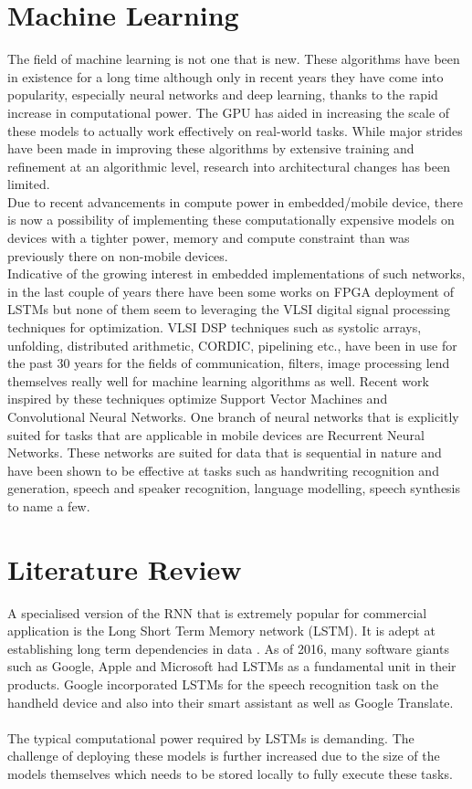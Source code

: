 \section{Machine Learning}
The field of machine learning is not one that is new. These algorithms have been in existence for a long time although only in recent years they have come into popularity, especially neural networks and deep learning, thanks to the rapid increase in computational power. The GPU has aided in increasing the scale of these models to actually work effectively on real-world tasks. While major strides have been made in improving these algorithms by extensive training and refinement at an algorithmic level, research into architectural changes has been limited. \\
Due to recent advancements in compute power in embedded/mobile device, there is now a possibility of implementing these computationally expensive models on devices with a tighter power, memory and compute constraint than was previously there on non-mobile devices. \\
Indicative of the growing interest in embedded implementations of such networks, in the last couple of years there have been some works on FPGA deployment of LSTMs but none of them seem to leveraging the VLSI digital signal processing techniques for optimization.%
VLSI DSP techniques such as systolic arrays, unfolding, distributed arithmetic, CORDIC, pipelining etc., have been in use for the past 30 years for the fields of communication, filters, image processing lend themselves really well for machine learning algorithms as well. Recent work inspired by these techniques optimize Support Vector Machines and Convolutional Neural Networks.%
One branch of neural networks that is explicitly suited for tasks that are applicable in mobile devices are Recurrent Neural Networks. These networks are suited for data that is sequential in nature and have been shown to be effective at tasks such as handwriting recognition and generation, speech and speaker recognition, language modelling, speech synthesis to name a few. \\

\section{Literature Review}
A specialised version of the RNN that is extremely popular for commercial application is the Long Short Term Memory network (LSTM). It is adept at establishing long term dependencies in data . As of 2016, many software giants such as Google, Apple and Microsoft had LSTMs as a fundamental unit in their products. Google incorporated LSTMs for the speech recognition task on the handheld device and also into their smart assistant as well as Google Translate. \\
\\
The typical computational power required by LSTMs is demanding. The challenge of deploying these models is further increased due to the size of the models themselves which needs to be stored locally to fully execute these tasks. 

